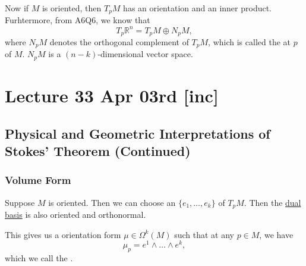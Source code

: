\documentclass[notoc,notitlepage]{tufte-book}
\begin{document}
Now if $M$ is oriented, then $T_p M$ has an orientation and an inner product.
Furhtermore, from A6Q6, we know that
\begin{equation*}
  T_p \mathbb{R}^n = T_p M \oplus N_p M,
\end{equation*}
where $N_p M$ denotes the orthogonal complement of $T_p M$, which is called the
 at $p$ of $M$. $N_p M$ is a $(n - k)$-dimensional vector
space.





\chapter{Lecture 33 Apr 03rd [inc]}%
\label{chp:lecture_33_apr_03rd}

\section{Physical and Geometric Interpretations of Stokes' Theorem (Continued)}%
\label{sec:physical_and_geometric_interpretations_of_stokes_theorem_continued}

\subsection{Volume Form}%
\label{sub:volume_form}

\begin{defn}\label{defn:volume_form}
  Suppose $M$ is oriented. Then we can choose an  $\{ e_1, \ldots, e_k \}$ of $T_p M$. Then the
  \hyperref[defn:dual_map]{dual basis} is also oriented and orthonormal.
  
  This gives us a  orientation form $\mu \in \Omega^k(M)$ such
  that at any $p \in M$, we have
  \begin{equation*}
    \mu_p = e^1 \land \hdots \land e^k,
  \end{equation*}
  which we call the . 
\end{defn}
\end{document}
